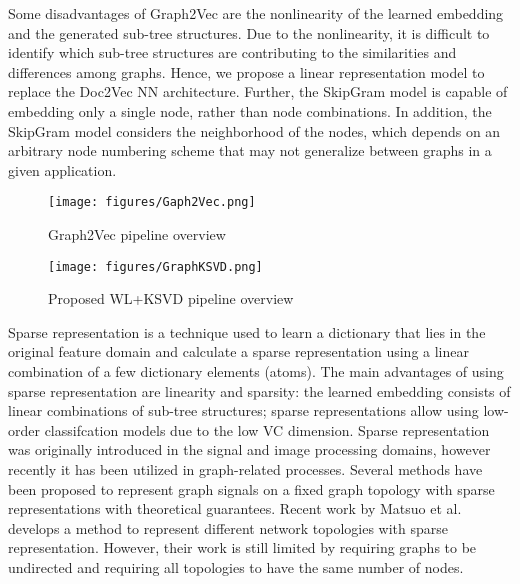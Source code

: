 Some disadvantages of Graph2Vec are the nonlinearity of the learned embedding and the generated sub-tree structures. Due to the nonlinearity, it is difficult to identify which sub-tree structures are contributing to the similarities and differences among graphs. Hence, we propose a linear representation model to replace the Doc2Vec NN architecture. Further, the SkipGram model is capable of embedding only a single node, rather than node combinations. In addition, the SkipGram model considers the neighborhood of the nodes, which depends on an arbitrary node numbering scheme that may not generalize between graphs in a given application.

\begin{figure}[!t]
\centerline{\texttt{[image: figures/Gaph2Vec.png]}}
\caption{Graph2Vec pipeline overview}\label{fig: G2V}
\end{figure}

\begin{figure}[!t]
\centerline{\texttt{[image: figures/GraphKSVD.png]}}
\caption{Proposed WL+KSVD pipeline overview}\label{fig: GKSVD}
\end{figure}

Sparse representation is a technique used to learn a dictionary that lies in the original feature domain and calculate a sparse representation using a linear combination of a few dictionary elements (atoms)\cite{Elad2010}. %
The main advantages of using sparse representation are linearity and sparsity: the learned embedding consists of linear combinations of sub-tree structures; sparse representations allow using low-order classifcation models due to the low VC dimension\cite{Neylon2006}. Sparse representation was originally introduced in the signal and image processing domains, however recently it has been utilized in graph-related processes. Several methods have been proposed to represent graph signals on a fixed graph topology with sparse representations with theoretical guarantees\cite{Yankelevsky2019}. %
Recent work by Matsuo et al.\cite{Matsuo2019} develops a method to represent different network topologies with sparse representation. However, their work is still limited by requiring graphs to be undirected and requiring all topologies to have the same number of nodes.

